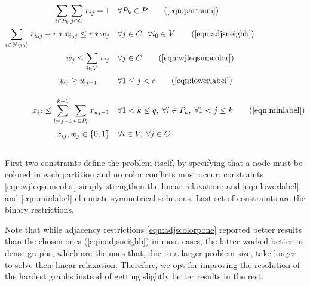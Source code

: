 \begin{align}
\sum_{i \in P_k} \sum_{j \in C} x_{ij} = 1 \quad &\forall P_k \in P \tag{\ref{eqn:partsum}} \\
 \sum_{i \in N(i_0)} x_{i_0j} + r * x_{i_0j} \leq r * w_j \quad &\forall j \in C, \; \forall i_0 \in V \tag{\ref{eqn:adjsneighb}} \\
 w_j \leq \sum_{i \in V} x_{ij} \quad &\forall j \in C \tag{\ref{eqn:wjleqsumcolor}} \\
 w_j \geq w_{j+1} \sumheight \quad &\forall 1 \leq j < c \tag{\ref{eqn:lowerlabel}} \\
 x_{ij} \leq \sum_{l = j-1}^{k-1} \sum_{u \in P_l} x_{uj-1} \quad &\forall 1 < k \leq q, \; \forall i \in P_k, \; \forall 1 < j \leq k \tag{\ref{eqn:minlabel}} \\
 x_{ij}, w_{j} \in \{0,1\} \quad &\forall i \in V, \; \forall j \in C \sumheight \nonumber
\end{align}

First two constraints define the problem itself, by specifying that a node must be colored in each partition and no color conflicts must occur; constraints \ref{eqn:wjleqsumcolor} simply strengthen the linear relaxation; and \ref{eqn:lowerlabel} and \ref{eqn:minlabel} eliminate symmetrical solutions. Last set of constraints are the binary restrictions.

Note that while adjacency restrictions \ref{eqn:adjscolorpone} reported better results than the chosen ones (\ref{eqn:adjsneighb}) in most cases, the latter worked better in dense graphs, which are the ones that, due to a larger problem size, take longer to solve their linear relaxation. Therefore, we opt for improving the resolution of the hardest graphs instead of getting slightly better results in the rest. 

\clearpage